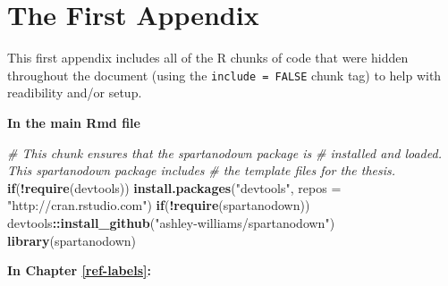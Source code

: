 \documentclass[ms]{uncgdissertationexp}
\newenvironment{Shaded}{\begin{snugshade}}{\end{snugshade}}
\newcommand{\KeywordTok}[1]{\textcolor[rgb]{0.13,0.29,0.53}{\textbf{#1}}}
\newcommand{\DataTypeTok}[1]{\textcolor[rgb]{0.13,0.29,0.53}{#1}}
\newcommand{\StringTok}[1]{\textcolor[rgb]{0.31,0.60,0.02}{#1}}
\newcommand{\CommentTok}[1]{\textcolor[rgb]{0.56,0.35,0.01}{\textit{#1}}}
\newcommand{\ControlFlowTok}[1]{\textcolor[rgb]{0.13,0.29,0.53}{\textbf{#1}}}
\newcommand{\OperatorTok}[1]{\textcolor[rgb]{0.81,0.36,0.00}{\textbf{#1}}}
\newcommand{\NormalTok}[1]{#1}
\theoremstyle{plain}
\theoremstyle{definition}
\theoremstyle{remark}
\begin{document}
  \chapter{The First Appendix}\label{the-first-appendix}
  
  This first appendix includes all of the R chunks of code that were
  hidden throughout the document (using the \texttt{include\ =\ FALSE}
  chunk tag) to help with readibility and/or setup.
  
  \textbf{In the main Rmd file}
  \begin{Shaded}
  \begin{Highlighting}[]
  \CommentTok{# This chunk ensures that the spartanodown package is}
  \CommentTok{# installed and loaded. This spartanodown package includes}
  \CommentTok{# the template files for the thesis.}
  \ControlFlowTok{if}\NormalTok{(}\OperatorTok{!}\KeywordTok{require}\NormalTok{(devtools))}
    \KeywordTok{install.packages}\NormalTok{(}\StringTok{"devtools"}\NormalTok{, }\DataTypeTok{repos =} \StringTok{"http://cran.rstudio.com"}\NormalTok{)}
  \ControlFlowTok{if}\NormalTok{(}\OperatorTok{!}\KeywordTok{require}\NormalTok{(spartanodown))}
  \NormalTok{  devtools}\OperatorTok{::}\KeywordTok{install_github}\NormalTok{(}\StringTok{"ashley-williams/spartanodown"}\NormalTok{)}
  \KeywordTok{library}\NormalTok{(spartanodown)}
  \end{Highlighting}
  \end{Shaded}
  \textbf{In Chapter \ref{ref-labels}:}
\end{document}
